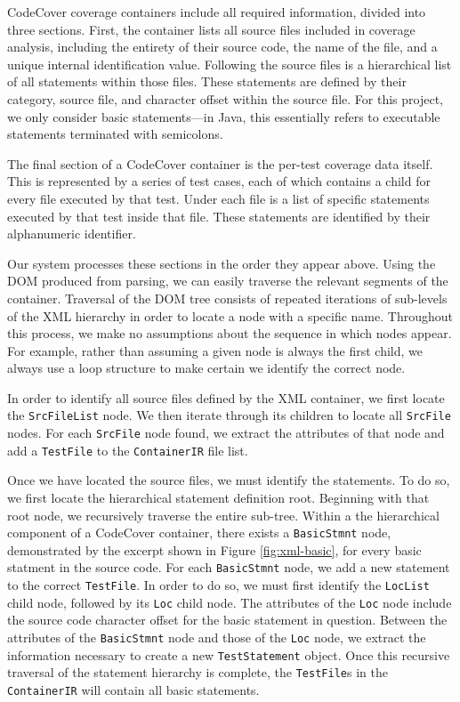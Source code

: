 CodeCover coverage containers include all required
information, divided into three sections.  First, the container lists all source
files included in coverage analysis, including the entirety of their source code,
the name of the file, and a unique internal identification value.  Following the source files
is a hierarchical list of all statements within those files.  These statements are defined by 
their category, source file, and character offset within the source file.  For this
project, we only consider basic statements---in Java, this essentially refers to executable
statements terminated with semicolons.  

The final section of a CodeCover container is the per-test coverage data itself.  This is
represented by a series of test cases, each of which contains a child for every file
executed by that test. Under each file is a list of specific statements executed by that
test inside that file.  These statements are identified by their alphanumeric identifier.

Our system processes these sections in the order they appear above.  Using the DOM produced
from parsing, we can easily traverse the relevant segments of the container.  Traversal of
the DOM tree consists of repeated iterations of sub-levels of the XML hierarchy in order
to locate a node with a specific name.  Throughout this process, we make no assumptions about
the sequence in which nodes appear.  For example, rather than assuming a given node is
always the first child, we always use a loop structure to make certain we identify the correct
node.

In order to identify all source files defined by the
XML container, we first locate the \texttt{SrcFileList} node.  We then iterate through its
children to locate all \texttt{SrcFile} nodes.  For each \texttt{SrcFile} node found, we 
extract the attributes of that node and add a \texttt{TestFile} to the \texttt{ContainerIR}
file list.  

Once we have located the source files, we must identify the statements.  To do so, we first
locate the hierarchical statement definition root.  Beginning with that root node, we recursively
traverse the entire sub-tree.  Within a the hierarchical component of a CodeCover container, there
exists a \texttt{BasicStmnt} node, demonstrated by the excerpt shown in Figure \ref{fig:xml-basic}, for every basic statment in the source code.  For each \texttt{BasicStmnt} node, we add a new statement to the 
correct \texttt{TestFile}.  In order to do so, we must first identify the \texttt{LocList} child
node, followed by its \texttt{Loc} child node.  The attributes of the \texttt{Loc} node include
the source code character offset for the basic statement in question.  Between the attributes of
the \texttt{BasicStmnt} node and those of the \texttt{Loc} node, we extract the information
necessary to create a new \texttt{TestStatement} object.  Once this recursive traversal of the
statement hierarchy is complete, the \texttt{TestFile}s in the \texttt{ContainerIR} will contain
all basic statements.


